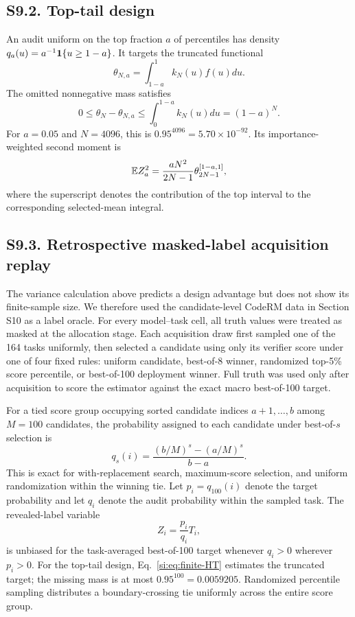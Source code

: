 \subsection*{S9.2. Top-tail design}

An audit uniform on the top fraction $a$ of percentiles has density $q_a(u)=a^{-1}\mathbf 1\{u\ge1-a\}$. It targets the truncated functional
\begin{equation}
\theta_{N,a}=\int_{1-a}^1k_N(u)f(u)du.
\label{si:eq:tail-target}
\end{equation}
The omitted nonnegative mass satisfies
\begin{equation}
0\le\theta_N-\theta_{N,a}
\le\int_0^{1-a}k_N(u)du=(1-a)^N.
\label{si:eq:tail-bias}
\end{equation}
For $a=0.05$ and $N=4096$, this is $0.95^{4096}=5.70\times10^{-92}$. Its importance-weighted second moment is
\begin{equation}
\mathbb{E} Z_a^2
=\frac{aN^2}{2N-1}\theta_{2N-1}^{[1-a,1]},
\label{si:eq:tail-second}
\end{equation}
where the superscript denotes the contribution of the top interval to the corresponding selected-mean integral.

\subsection*{S9.3. Retrospective masked-label acquisition replay}

The variance calculation above predicts a design advantage but does not show its finite-sample size. We therefore used the candidate-level CodeRM data in Section S10 as a label oracle. For every model--task cell, all truth values were treated as masked at the allocation stage. Each acquisition draw first sampled one of the 164 tasks uniformly, then selected a candidate using only its verifier score under one of four fixed rules: uniform candidate, best-of-8 winner, randomized top-5\% score percentile, or best-of-100 deployment winner. Full truth was used only after acquisition to score the estimator against the exact macro best-of-100 target.

For a tied score group occupying sorted candidate indices $a+1,\ldots,b$ among $M=100$ candidates, the probability assigned to each candidate under best-of-$s$ selection is
\begin{equation}
q_s(i)=\frac{(b/M)^s-(a/M)^s}{b-a}.
\label{si:eq:finite-candidate-probability}
\end{equation}
This is exact for with-replacement search, maximum-score selection, and uniform randomization within the winning tie. Let $p_i=q_{100}(i)$ denote the target probability and let $q_i$ denote the audit probability within the sampled task. The revealed-label variable
\begin{equation}
Z_i=\frac{p_i}{q_i}T_i,
\label{si:eq:finite-HT}
\end{equation}
is unbiased for the task-averaged best-of-100 target whenever $q_i>0$ wherever $p_i>0$. For the top-tail design, Eq.~\ref{si:eq:finite-HT} estimates the truncated target; the missing mass is at most $0.95^{100}=0.0059205$. Randomized percentile sampling distributes a boundary-crossing tie uniformly across the entire score group.

